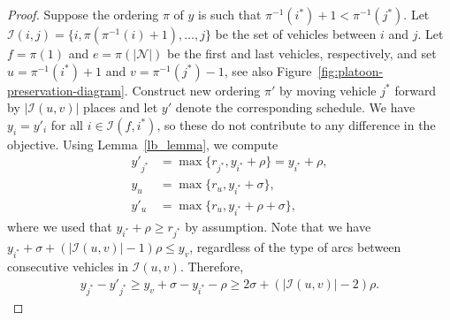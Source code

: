 \documentclass[a4paper]{article}
\theoremstyle{definition}
\theoremstyle{plain}
\begin{document}
\Exhaustive*
\begin{proof}
  Suppose the ordering $\pi$ of $y$ is such that
  $\pi^{-1}(i^{*}) + 1 < \pi^{-1}(j^{*})$.
  Let $\mathcal{I}(i,j) = \{ i, \pi(\pi^{-1}(i) + 1), \dots, j \}$ be the set of
  vehicles between $i$ and $j$.
  Let $f = \pi(1)$ and $e = \pi(|\mathcal{N}|)$ be the first and last vehicles,
  respectively, and set $u = \pi^{-1}(i^{*}) + 1$ and $v = \pi^{-1}(j^{*}) - 1$, see also Figure~\ref{fig:platoon-preservation-diagram}.
  Construct new ordering $\pi'$ by moving vehicle $j^{*}$ forward
  by $|\mathcal{I}(u,v)|$ places and let $y'$ denote the corresponding schedule.
  We have $y_{i} = y'_{i}$ for all $i \in \mathcal{I}(f, i^{*})$, so these do not
  contribute to any difference in the objective.
  Using Lemma~\ref{lb_lemma}, we compute
  \begin{align*}
    y'_{j^{*}} &= \max \{ r_{j^{*}}, y_{i^{*}} + \rho \} = y_{i^{*}} + \rho , \\
    y_{u} &= \max \{ r_{u}, y_{i^{*}} + \sigma \} , \\
    y'_{u} &= \max \{ r_{u}, y_{i^{*}} + \rho + \sigma \} ,
  \end{align*}
  where we used that $y_{i^{*}} + \rho \geq r_{j^{*}}$ by assumption.
  Note that we have
  $y_{i^{*}} + \sigma + (|\mathcal{I}(u,v)| - 1) \rho \leq y_{v}$, regardless of the
  type of arcs between consecutive vehicles in $\mathcal{I}(u,v)$. Therefore,
  \begin{align*}
    y_{j^{*}} - y'_{j^{*}} \geq y_{v} + \sigma - y_{i^{*}} - \rho \geq 2 \sigma + (|\mathcal{I}(u,v)| - 2) \rho .
  \end{align*}


\end{proof}
\end{document}
